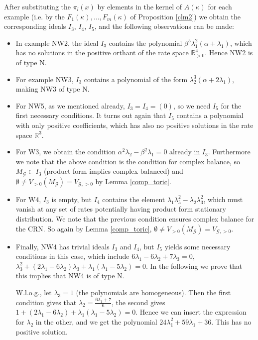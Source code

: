 \documentclass{amsart}
\theoremstyle{definition}
\theoremstyle{remark}
\theoremstyle{Conjecture/open problem}
\theoremstyle{assumption}
\theoremstyle{conjecture}
\def\la{\lambda}
\def\la{\lambda}
\def\k{\kappa}
\def\cG{\mathcal{G}}
\numberwithin{equation}{section}
\begin{document}
After substituting the $\pi _l(x)$ by elements in the kernel of $A(\kappa )$ for each example (i.e. by the $F_1(\k), \ldots ,F_m(\k)$ of Proposition \ref{clm2}) we obtain the corresponding ideals $I_3$, $I_4$, $I_5$, and the following observations can be made:
\begin{itemize}
\item In example NW2, the ideal $I_3$ contains the polynomial $\beta ^5\lambda _1^2(\alpha +\lambda _1)$, which has no solutions in the positive orthant of the rate space $\mathbb{R}^4_{>0}$. Hence NW2 is of type N.
\item For example NW3, $I_3$ contains a polynomial of the form $\lambda _2^3(\alpha + 2\lambda _1)$, making NW3 of type N.
\item For NW5, as we mentioned already, $I_3=I_4=(0)$, so we need $I_5$ for the first necessary conditions. It turns out again that $I_5$ contains a polynomial with only positive coefficients, which has also no positive solutions in the rate space $\mathbb{R}^3$.
\item For W3, we obtain the condition $\alpha ^2\lambda _2-\beta ^2\lambda _1=0$ already in $I_3$. Furthermore we note that the above condition is the condition for complex balance, so $M_\cG\subset I_3$  (product form implies complex balanced) and $\emptyset\neq V_{>0}(M_\cG)= V_{\cG,>0}$ by Lemma \ref{comp_toric}. 
\item For W4, $I_3$ is empty, but $I_4$ contains the element $\lambda _1\lambda _5^2-\lambda _2\lambda _3^2$, which must vanish at any set of rates potentially having product form stationary distribution. We note that the previous condition ensures complex balance for the CRN. So again by Lemma \ref{comp_toric}, $\emptyset\neq V_{>0}(M_\cG)= V_{\cG,>0}$. 
\item Finally, NW4 has trivial ideals $I_3$ and $I_4$, but $I_5$ yields some necessary conditions in this case, which include $6\lambda _1 - 6\lambda _2+7\lambda _3=0$, $\lambda _3^2+(2\la_1-6\la_2)\la_3+\la_1(\la_1-5\la_2)=0$.
In the following we prove that this implies that NW4 is of type N.

W.l.o.g., let $\la_3=1$ (the polynomials are homogeneous). Then the first condition gives that $\la_2=\frac{6\la_1+7}{6}$, the second gives $1+(2\la_1-6\la_2)+\la_1(\la_1-5\la_2)=0$. 
Hence we can insert the expression for $\la_2$ in the other, and we get the polynomial
$24\la_1^2+59\la_1+36$. This has no positive solution.
\end{itemize}
\end{document}
